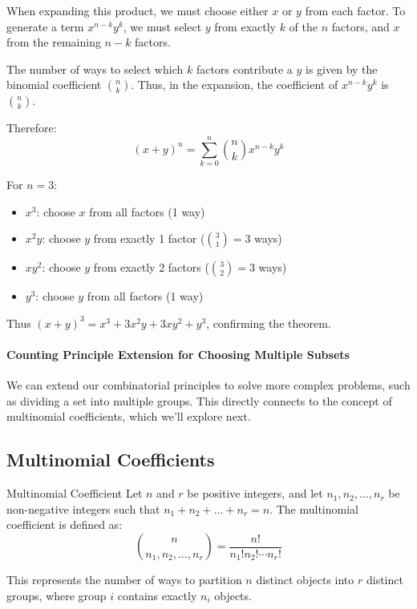 When expanding this product, we must choose either $x$ or $y$ from each factor. To generate a term $x^{n-k}y^k$, we must select $y$ from exactly $k$ of the $n$ factors, and $x$ from the remaining $n-k$ factors.

The number of ways to select which $k$ factors contribute a $y$ is given by the binomial coefficient $\binom{n}{k}$. Thus, in the expansion, the coefficient of $x^{n-k}y^k$ is $\binom{n}{k}$.

Therefore:
\[
(x+y)^n = \sum_{k=0}^{n} \binom{n}{k}x^{n-k}y^k
\]

\begin{example}
For $n=3$:
\begin{itemize}[leftmargin=1.25em]
    \item $x^3$: choose $x$ from all factors (1 way)
    \item $x^2y$: choose $y$ from exactly 1 factor ($\binom{3}{1}=3$ ways)
    \item $xy^2$: choose $y$ from exactly 2 factors ($\binom{3}{2}=3$ ways)
    \item $y^3$: choose $y$ from all factors (1 way)
\end{itemize}

Thus $(x+y)^3 = x^3 + 3x^2y + 3xy^2 + y^3$, confirming the theorem.
\end{example}

\paragraph{Counting Principle Extension for Choosing Multiple Subsets}
We can extend our combinatorial principles to solve more complex problems, such as dividing a set into multiple groups. This directly connects to the concept of multinomial coefficients, which we'll explore next.

\subsection{Multinomial Coefficients}
\begin{definitionboxbreak}{Multinomial Coefficient}
    Let $n$ and $r$ be positive integers, and let $n_1, n_2, \ldots, n_r$ be non-negative integers such that $n_1 + n_2 + \ldots + n_r = n$. The multinomial coefficient is defined as:
    \[
    \binom{n}{n_1, n_2, \ldots, n_r} = \frac{n!}{n_1! n_2! \cdots n_r!}
    \]

    This represents the number of ways to partition $n$ distinct objects into $r$ distinct groups, where group $i$ contains exactly $n_i$ objects.
\end{definitionboxbreak}


